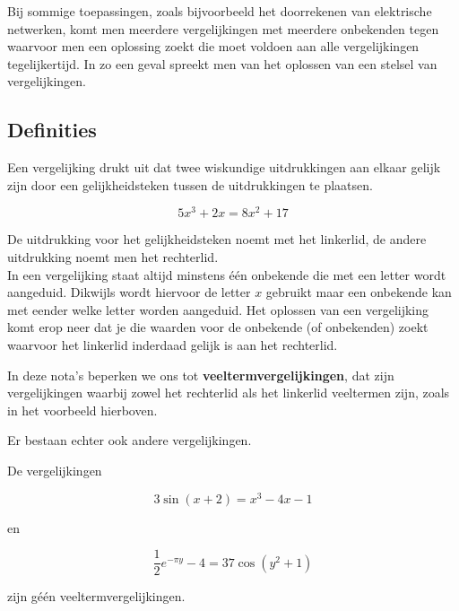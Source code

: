 \noindent Bij sommige toepassingen, zoals bijvoorbeeld het doorrekenen van elektrische netwerken, komt men meerdere vergelijkingen met meerdere onbekenden tegen waarvoor men een oplossing zoekt die moet voldoen aan alle vergelijkingen tegelijkertijd. In zo een geval spreekt men van het oplossen van een stelsel van vergelijkingen.\\

\subsection{Definities}

%	

\begin{definitie}
	Een vergelijking drukt uit dat twee wiskundige uitdrukkingen aan elkaar gelijk zijn door een gelijkheidsteken tussen de uitdrukkingen te plaatsen.
\end{definitie}

\begin{voorbeeld}
	\[5x^3 + 2x = 8x^2 + 17\]
\end{voorbeeld}

De uitdrukking voor het gelijkheidsteken noemt met het linkerlid, de andere uitdrukking noemt men het rechterlid.\\

In een vergelijking staat altijd minstens \'{e}\'{e}n onbekende die met een letter wordt aangeduid. Dikwijls wordt hiervoor de letter $x$ gebruikt maar een onbekende kan met eender welke letter worden aangeduid. Het oplossen van een vergelijking komt erop neer dat je die waarden voor de onbekende (of onbekenden) zoekt waarvoor het linkerlid inderdaad gelijk is aan het rechterlid.

\begin{definitie}
	In deze nota's beperken we ons tot {\bf veeltermvergelijkingen}, dat zijn vergelijkingen waarbij zowel het rechterlid als het linkerlid veeltermen zijn, zoals in het voorbeeld hierboven.
\end{definitie} 

Er bestaan echter ook andere vergelijkingen. 

\begin{voorbeeld}
	De vergelijkingen

\[ 3\sin(x+2)=x^3 - 4x -1 \]

en

\[ \frac{1}{2} e^{-\pi y} - 4 = 37 \cos(y^2 +1) \]

zijn g\'{e}\'{e}n veeltermvergelijkingen.\\
\end{voorbeeld}

